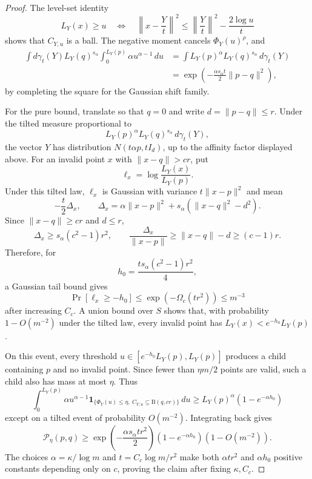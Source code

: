 \documentclass[10pt]{article}
\theoremstyle{definition}
\newcommand{\Ball}{\mathrm{B}}
\begin{document}
\begin{proof}
   The level-set identity
   \[
      L_Y(x)\ge u
      \quad\Longleftrightarrow\quad
      \left\|x-\frac Yt\right\|^2
      \le
      \left\|\frac Yt\right\|^2-\frac{2\log u}{t}
   \]
   shows that $C_{Y,u}$ is a ball. The negative moment cancels $\Phi_Y(u)^\rho$, and
   \[
   \begin{aligned}
      \int d\gamma_t(Y)L_Y(q)^{s_\alpha}
      \int_0^{L_Y(p)}\alpha u^{\alpha-1}\,du
      &=
      \int L_Y(p)^\alpha L_Y(q)^{s_\alpha}\,d\gamma_t(Y)\\
      &=
      \exp\!\left(-\frac{\alpha s_\alpha t}{2}\|p-q\|^2\right),
   \end{aligned}
   \]
   by completing the square for the Gaussian shift family.

   For the pure bound, translate so that $q=0$ and write $d=\|p-q\|\le r$. Under the tilted measure proportional to
   \[
      L_Y(p)^\alpha L_Y(q)^{s_\alpha}\,d\gamma_t(Y),
   \]
   the vector $Y$ has distribution $N(t\alpha p,tI_d)$, up to the affinity factor displayed above. For an invalid point $x$ with $\|x-q\|>cr$, put
   \[
      \ell_x=\log\frac{L_Y(x)}{L_Y(p)}.
   \]
   Under this tilted law, $\ell_x$ is Gaussian with variance $t\|x-p\|^2$ and mean
   \[
      -\frac t2\Delta_x,
      \qquad
      \Delta_x
      =
      \alpha\|x-p\|^2+s_\alpha(\|x-q\|^2-d^2).
   \]
   Since $\|x-q\|\ge cr$ and $d\le r$,
   \[
      \Delta_x\ge s_\alpha(c^2-1)r^2,
      \qquad
      \frac{\Delta_x}{\|x-p\|}\ge \|x-q\|-d\ge(c-1)r .
   \]
   Therefore, for
   \[
      h_0=\frac{ts_\alpha(c^2-1)r^2}{4},
   \]
   a Gaussian tail bound gives
   \[
      \Pr[\ell_x\ge-h_0]\le
      \exp\!\left(-\Omega_c(tr^2)\right)\le m^{-3}
   \]
   after increasing $C_c$. A union bound over $S$ shows that, with probability $1-O(m^{-2})$ under the tilted law, every invalid point has $L_Y(x)<e^{-h_0}L_Y(p)$.

   On this event, every threshold $u\in[e^{-h_0}L_Y(p),L_Y(p)]$ produces a child containing $p$ and no invalid point. Since fewer than $\eta m/2$ points are valid, such a child also has mass at most $\eta$. Thus
   \[
      \int_0^{L_Y(p)}
      \alpha u^{\alpha-1}
      \mathbf 1_{\{\Phi_Y(u)\le\eta,\ C_{Y,u}\subseteq \Ball(q,cr)\}}\,du
      \ge
      L_Y(p)^\alpha(1-e^{-\alpha h_0})
   \]
   except on a tilted event of probability $O(m^{-2})$. Integrating back gives
   \[
      \mathcal P_\eta(p,q)
      \ge
      \exp\!\left(-\frac{\alpha s_\alpha tr^2}{2}\right)
      (1-e^{-\alpha h_0})(1-O(m^{-2})).
   \]
   The choices $\alpha=\kappa/\log m$ and $t=C_c\log m/r^2$ make both $\alpha tr^2$ and $\alpha h_0$ positive constants depending only on $c$, proving the claim after fixing $\kappa,C_c$.
\end{proof}
\end{document}
